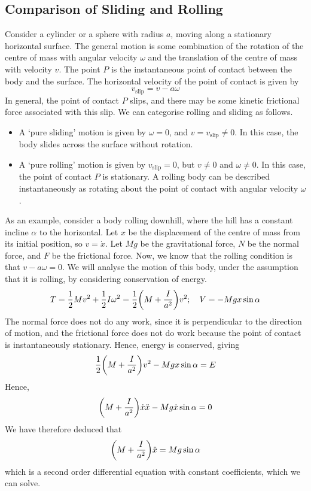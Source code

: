 \subsection{Comparison of Sliding and Rolling}
Consider a cylinder or a sphere with radius \(a\), moving along a stationary horizontal surface.
The general motion is some combination of the rotation of the centre of mass with angular velocity \(\omega\) and the translation of the centre of mass with velocity \(v\).
The point \(P\) is the instantaneous point of contact between the body and the surface.
The horizontal velocity of the point of contact is given by
\[
	v_\text{slip} = v - a\omega
\]
In general, the point of contact \(P\) slips, and there may be some kinetic frictional force associated with this slip.
We can categorise rolling and sliding as follows.
\begin{itemize}
	\item A `pure sliding' motion is given by \(\omega = 0\), and \(v = v_\text{slip} \neq 0\).
	      In this case, the body slides across the surface without rotation.
	\item A `pure rolling' motion is given by \(v_\text{slip} = 0\), but \(v \neq 0\) and \(\omega \neq 0\).
	      In this case, the point of contact \(P\) is stationary.
	      A rolling body can be described instantaneously as rotating about the point of contact with angular velocity \(\omega\).
\end{itemize}
As an example, consider a body rolling downhill, where the hill has a constant incline \(\alpha\) to the horizontal.
Let \(x\) be the displacement of the centre of mass from its initial position, so \(v = \dot x\).
Let \(Mg\) be the gravitational force, \(N\) be the normal force, and \(F\) be the frictional force.
Now, we know that the rolling condition is that \(v - a\omega = 0\).
We will analyse the motion of this body, under the assumption that it is rolling, by considering conservation of energy.
\[
	T = \frac{1}{2}Mv^2 + \frac{1}{2}I\omega^2 = \frac{1}{2}\qty(M + \frac{I}{a^2})v^2;\quad V = -Mgx\sin\alpha
\]
The normal force does not do any work, since it is perpendicular to the direction of motion, and the frictional force does not do work because the point of contact is instantaneously stationary.
Hence, energy is conserved, giving
\[
	\frac{1}{2}\qty(M + \frac{I}{a^2})v^2 - Mgx\sin\alpha = E
\]
Hence,
\[
	\qty(M + \frac{I}{a^2})\dot x \ddot x - Mg \dot x \sin\alpha = 0
\]
We have therefore deduced that
\[
	\qty(M + \frac{I}{a^2})\ddot x = Mg\sin\alpha
\]
which is a second order differential equation with constant coefficients, which we can solve.
